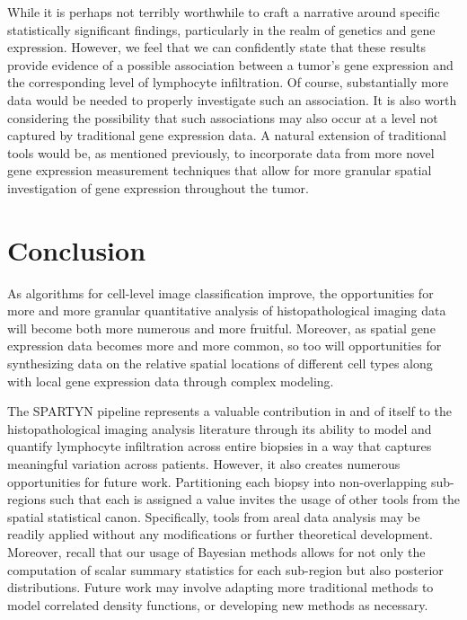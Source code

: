 \documentclass[
]{book}
\begin{document}
While it is perhaps not terribly worthwhile to craft a narrative around
specific statistically significant findings, particularly in the realm of
genetics and gene expression. However, we feel that we can confidently
state that these results provide evidence of a possible association between
a tumor's gene expression and the corresponding level of lymphocyte
infiltration. Of course, substantially more data would be needed to
properly investigate such an association. It is also worth considering
the possibility that such associations may also occur at a level not
captured by traditional gene expression data. A natural extension of
traditional tools would be, as mentioned previously, to incorporate data
from more novel gene expression measurement techniques that allow for
more granular spatial investigation of gene expression throughout
the tumor.

\hypertarget{conclusion}{%
\chapter{Conclusion}\label{conclusion}}

As algorithms for cell-level image classification improve, the
opportunities for more and more granular quantitative analysis of
histopathological imaging data will become both more numerous and more
fruitful. Moreover, as spatial gene expression data becomes more and
more common, so too will opportunities for synthesizing data on the
relative spatial locations of different cell types along with local gene
expression data through complex modeling.

The SPARTYN pipeline represents a valuable contribution in and of itself
to the histopathological imaging analysis literature through its ability
to model and quantify lymphocyte infiltration across entire biopsies in
a way that captures meaningful variation across patients. However, it
also creates numerous opportunities for future work. Partitioning each
biopsy into non-overlapping sub-regions such that each is assigned a
value invites the usage of other tools from the spatial statistical
canon. Specifically, tools from areal data analysis may be readily
applied without any modifications or further theoretical development.
Moreover, recall that our usage of Bayesian methods allows for not only
the computation of scalar summary statistics for each sub-region but
also posterior distributions. Future work may involve adapting more
traditional methods to model correlated density functions, or developing
new methods as necessary.
\end{document}
